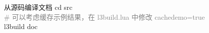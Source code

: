 \begin{frame}
{\begin{columns}
\begin{column}{0.7\textwidth}
        \begin{exampleblock}{\faTerminal{} 从源码编译文档}
          \ttfamily\footnotesize
          cd src\\
          \textcolor{gray}{\# 可以考虑缓存示例结果，在 l3build.lua 中修改 cachedemo=true} \\
          l3build doc
        \end{exampleblock}
      \end{column}
      \begin{column}{0.3\textwidth}
      \end{column}
    \end{columns}
  }


\end{frame}
